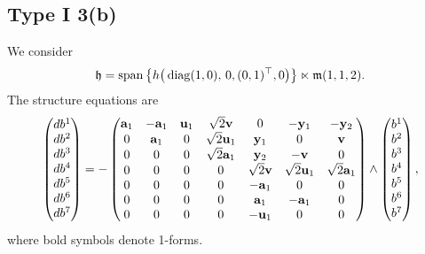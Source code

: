 \documentclass[11pt]{article}
\numberwithin{equation}{section}
\newcommand\fh{{\frak h}}
\newcommand\fm{{\frak m}}
\newcommand\by{{\mathbf y}}
\newcommand{\Span}{\operatorname{span}}
\newcommand{\diag}{\operatorname{diag}}
\begin{document}
\subsection{Type I 3(b)}
We consider
\begin{gather*}\fh=\Span\big\{ h\big(\diag(1,0),\, 0,(0,1)^\top,0\big) \big\}\ltimes\fm(1,1,2).\end{gather*}
The structure equations are
\begin{gather}\label{EI3(b)}\left(\begin{matrix} db^1\\db^2\\db^3\\db^4\\db^5\\db^6\\db^7\end{matrix}\right) = -\left(
\begin{matrix}
{\bf a}_1&- {\bf a}_1&{\bf u}_1&\sqrt{2} {\bf v}&0&-\by_1&-\by_2\\
0&{\bf a}_1&0&\sqrt{2} {\bf u}_1&\by_1&0&{\bf v}\\
0&0&0& \sqrt{2} {\bf a}_1&\by_2&-{\bf v}&0\\
0&0&0&0&\sqrt{2} {\bf v}&\sqrt{2} {\bf u}_1&\sqrt 2 {\bf a}_1\\
0&0&0&0&-{\bf a}_1&0&0\\
0&0&0&0&{\bf a}_1&-{\bf a}_1&0\\
0&0&0&0&-{\bf u}_1&0&0
\end{matrix}\right) \wedge \left(\begin{matrix} b^1\\b^2\\b^3\\b^4\\b^5\\b^6\\b^7\end{matrix}\right),
\end{gather}
where bold symbols denote 1-forms.
\end{document}

